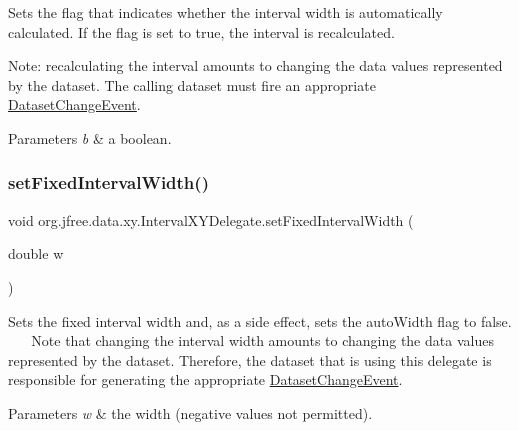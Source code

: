 Sets the flag that indicates whether the interval width is automatically calculated. If the flag is set to {\ttfamily true}, the interval is recalculated. 

Note\+: recalculating the interval amounts to changing the data values represented by the dataset. The calling dataset must fire an appropriate \mbox{\hyperlink{}{Dataset\+Change\+Event}}.


\begin{DoxyParams}{Parameters}
{\em b} & a boolean. \\
\hline
\end{DoxyParams}
\mbox{\label{classorg_1_1jfree_1_1data_1_1xy_1_1_interval_x_y_delegate_a94e524aa9f513292c3349871205de0b2}} 
\subsubsection{\texorpdfstring{set\+Fixed\+Interval\+Width()}{setFixedIntervalWidth()}}
{\footnotesize\ttfamily void org.\+jfree.\+data.\+xy.\+Interval\+X\+Y\+Delegate.\+set\+Fixed\+Interval\+Width (\begin{DoxyParamCaption}\item[{double}]{w }\end{DoxyParamCaption})}

Sets the fixed interval width and, as a side effect, sets the {\ttfamily auto\+Width} flag to {\ttfamily false}. ~\newline
~\newline
 Note that changing the interval width amounts to changing the data values represented by the dataset. Therefore, the dataset that is using this delegate is responsible for generating the appropriate \mbox{\hyperlink{}{Dataset\+Change\+Event}}.


\begin{DoxyParams}{Parameters}
{\em w} & the width (negative values not permitted). \\
\hline
\end{DoxyParams}
\mbox{\label{classorg_1_1jfree_1_1data_1_1xy_1_1_interval_x_y_delegate_a078c75387df7598aa2fe3352b5d60ddf}} 
